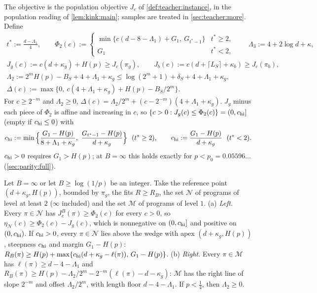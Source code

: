 The objective is the population objective $J_c$ of \cref{def:teacher:instance}, in the population reading of \cref{lem:kink:main}; samples are treated in \cref{sec:teacher:more}. Define
\begin{gather*}
t^*:=\tfrac{d-\Lambda_1}4,\qquad
\Phi_2(c):=\begin{cases}\min\{c(d-8-\Lambda_1)+G_1,\ G_{t^*-1}\}&t^*\ge2,\\ G_1&t^*<2,\end{cases}\qquad\Lambda_3:=4+2\log d+\kappa,\\
J_g(c):=c(d+\kappa_g)+H(p)\ge J_c(\pi_g),\qquad J_b(c):=c(d+\lceil L_S\rceil+\kappa_b)\ge J_c(\pi_b),\\
\Lambda_2:=2^mH(p)-B_S+4+\Lambda_1+\kappa_g\le\log(2^m+1)+\delta_S+4+\Lambda_1+\kappa_g,\\
\Delta(c):=\max\{0,\ c(4+\Lambda_1+\kappa_g)+H(p)-B_S/2^m\}.
\end{gather*}
For $c\ge2^{-m}$ and $\Lambda_2\ge0$, $\Delta(c)=\Lambda_2/2^m+(c-2^{-m})(4+\Lambda_1+\kappa_g)$. $J_g$ minus each piece of $\Phi_2$ is affine and increasing in $c$, so $\{c>0:J_g(c)\le\Phi_2(c)\}=(0,c_{\rm hi}]$ (empty if $c_{\rm hi}\le0$) with
\[
c_{\rm hi}:=\min\Big\{\frac{G_1-H(p)}{8+\Lambda_1+\kappa_g},\ \frac{G_{t^*-1}-H(p)}{d+\kappa_g}\Big\}\ \ (t^*\ge2),\qquad c_{\rm hi}:=\frac{G_1-H(p)}{d+\kappa_g}\ \ (t^*<2).
\]
$c_{\rm hi}>0$ requires $G_1>H(p)$; at $B=\infty$ this holds exactly for $p<p_0=0.05596\ldots$ (\cref{sec:parity:full}).

\begin{proposition}\label{prop:teacher:kinks}
Let $B=\infty$ or let $B\ge\log(1/p)$ be an integer. Take the reference point $(d+\kappa_g,H(p))$, bounded by $\pi_g$, the fits $R\ge R_B$, the set $\mathcal N$ of programs of level at least $2$ ($\infty$ included) and the set $\mathcal M$ of programs of level $1$.
(a) \emph{Left.} Every $\pi\in\mathcal N$ has $J^B_c(\pi)\ge\Phi_2(c)$ for every $c>0$, so $\eta_{\mathcal N}(c)\ge\Phi_2(c)-J_g(c)$, which is nonnegative on $(0,c_{\rm hi}]$ and positive on $(0,c_{\rm hi})$. If $c_{\rm hi}>0$, every $\pi\in\mathcal N$ lies above the wedge with apex $(d+\kappa_g,H(p))$, steepness $c_{\rm hi}$ and margin $G_1-H(p)$: $R_B(\pi)\ge H(p)+\max\{c_{\rm hi}(d+\kappa_g-\ell(\pi)),\,G_1-H(p)\}$.
(b) \emph{Right.} Every $\pi\in\mathcal M$ has $\ell(\pi)\ge d-4-\Lambda_1$ and $R_B(\pi)\ge H(p)-\Lambda_2/2^m-2^{-m}(\ell(\pi)-d-\kappa_g)$: $\mathcal M$ has the right line of slope $2^{-m}$ and offset $\Lambda_2/2^m$, with length floor $d-4-\Lambda_1$. If $p<\frac14$, then $\Lambda_2\ge0$.
\end{proposition}

